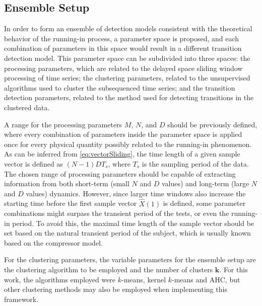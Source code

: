 \documentclass[preprint,11pt,number]{elsarticle}
\begin{document}
\subsection{Ensemble Setup}\label{subsec:EnsembleSetup}

In order to form an ensemble of detection models consistent with the theoretical behavior of the running-in process, a parameter space is proposed, and each combination of parameters in this space would result in a different transition detection model. This parameter space can be subdivided into three spaces: the processing parameters, which are related to the delayed space sliding window processing of time series; the clustering parameters, related to the unsupervised algorithms used to cluster the subsequenced time series; and the transition detection parameters, related to the method used for detecting transitions in the clustered data.

A range for the processing parameters $M$, $N$, and $D$ should be previously defined, where every combination of parameters inside the parameter space is applied once for every physical quantity possibly related to the running-in phenomenon. As can be inferred from \eqref{eq:vectorSliding}, the time length of a given sample vector is defined as $(N-1)DT_s$, where $T_s$ is the sampling period of the data. The chosen range of processing parameters should be capable of extracting information from both short-term (small $N$ and $D$ values) and long-term (large $N$ and $D$ values) dynamics. However, since larger time windows also increase the starting time before the first sample vector $\hat{X}(1)$ is defined, some parameter combinations might surpass the transient period of the tests, or even the running-in period. To avoid this, the maximal time length of the sample vector should be set based on the natural transient period of the subject, which is usually known based on the compressor model.

For the clustering parameters, the variable parameters for the ensemble setup are the clustering algorithm to be employed and the number of clusters $\bm{k}$. For this work, the algorithms employed were $k$-means, kernel $k$-means and AHC, but other clustering methods may also be employed when implementing this framework.
\end{document}
